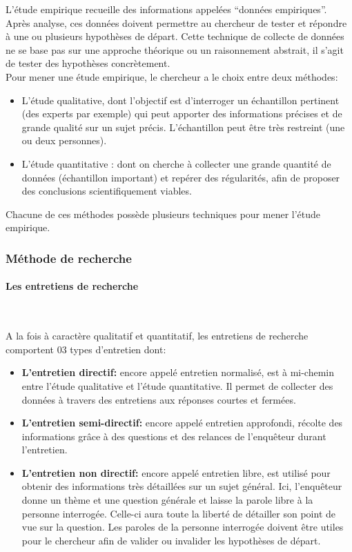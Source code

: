 \noindent

	L’étude empirique recueille des informations appelées “données empiriques”. Après analyse, ces données doivent permettre au chercheur de tester et répondre à une ou plusieurs hypothèses de départ. Cette technique de collecte de données ne se base pas sur une approche théorique ou un raisonnement abstrait, il s’agit de tester des hypothèses concrètement.\\
	Pour mener une étude empirique, le chercheur a le choix entre deux méthodes: 
\begin{itemize}
	\item L’étude qualitative, dont l’objectif est d’interroger un échantillon pertinent (des experts par exemple) qui peut apporter des informations précises et de grande qualité sur un sujet précis. L’échantillon peut être très restreint (une ou deux personnes).
	\item L’étude quantitative : dont on cherche à collecter une grande quantité de données (échantillon important) et repérer des régularités, afin de proposer des conclusions scientifiquement viables.
\end{itemize}
	Chacune de ces méthodes possède plusieurs techniques pour mener l’étude empirique. 

\subsubsection{Méthode de recherche}
\paragraph{Les entretiens de recherche } ~~\\
	
\noindent
	
	A la fois à caractère qualitatif et quantitatif, les entretiens de recherche comportent 03 types d’entretien dont:
\begin{itemize}
	\item \textbf{L’entretien directif:} encore appelé entretien normalisé, est à mi-chemin entre l’étude qualitative et l’étude quantitative. Il permet de collecter des données à travers des entretiens aux réponses courtes et fermées.
	\item \textbf{L’entretien semi-directif:} encore appelé entretien approfondi, récolte des informations grâce à des questions et des relances de l’enquêteur durant l’entretien.
	\item \textbf{L’entretien non directif:} encore appelé entretien libre, est utilisé pour obtenir des informations très détaillées sur un sujet général. Ici, l’enquêteur donne un thème et une question générale et laisse la parole libre à la personne interrogée. Celle-ci aura toute la liberté de détailler son point de vue sur la question. Les paroles de la personne interrogée doivent être utiles pour le chercheur afin de valider ou invalider les hypothèses de départ.
\end{itemize}
	
